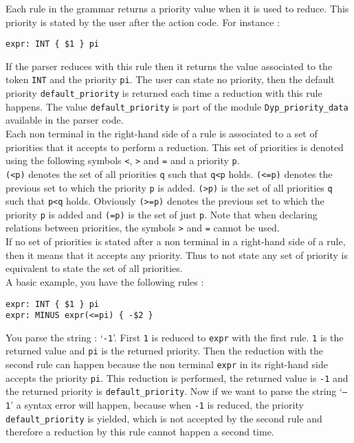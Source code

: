 \documentclass[12pt]{article}
\begin{document}
{Each rule in the grammar returns a priority value when it is used to reduce. This priority is stated by the user after the action code. For instance :
\begin{verbatim}
expr: INT { $1 } pi
\end{verbatim}
If the parser reduces with this rule then it returns the value associated to the token \texttt{INT} and the priority \texttt{pi}. The user can state no priority, then the default priority \texttt{default\_priority} is returned each time a reduction with this rule happens. The value \verb|default_priority| is part of the module \verb|Dyp_priority_data| available in the parser code.\\

Each non terminal in the right-hand side of a rule is associated to a set of priorities that it accepts to perform a reduction. This set of priorities is denoted using the following symbols \texttt{<}, \texttt{>} and \texttt{=} and a priority \texttt{p}.\\

\texttt{(<p)} denotes the set of all priorities \texttt{q} such that \texttt{q<p} holds. \texttt{(<=p)} denotes the previous set to which the priority \texttt{p} is added. \texttt{(>p)} is the set of all priorities \texttt{q} such that \texttt{p<q} holds. Obviously \texttt{(>=p)} denotes the previous set to which the priority \texttt{p} is added and \texttt{(=p)} is the set of just \texttt{p}. Note that when declaring relations between priorities, the symbols \texttt{>} and \texttt{=} cannot be used.\\

If no set of priorities is stated after a non terminal in a right-hand side of a rule, then it means that it accepts any priority. Thus to not state any set of priority is equivalent to state the set of all priorities.\\

A basic example, you have the following rules :
\begin{verbatim}
expr: INT { $1 } pi
expr: MINUS expr(<=pi) { -$2 }
\end{verbatim}
You parse the string : `\texttt{-1}'. First \texttt{1} is reduced to \texttt{expr} with the first rule. \texttt{1} is the returned value and \texttt{pi} is the returned priority. Then the reduction with the second rule can happen because the non terminal \texttt{expr} in its right-hand side accepts the priority \texttt{pi}. This reduction is performed, the returned value is \texttt{-1} and the returned priority is \texttt{default\_priority}. Now if we want to parse the string `\texttt{--1}' a syntax error will happen, because when \texttt{-1} is reduced, the priority \texttt{default\_priority} is yielded, which is not accepted by the second rule and therefore a reduction by this rule cannot happen a second time.\\

}
\end{document}
